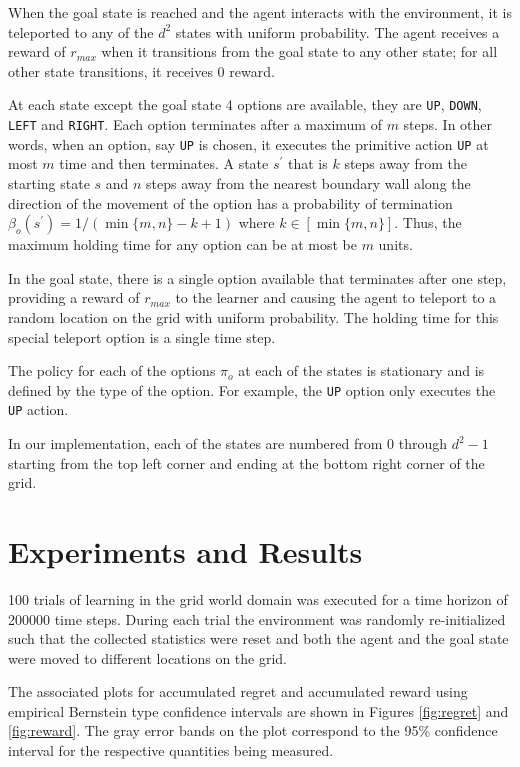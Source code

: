 When the goal state is reached and the agent interacts with the environment, it is teleported to any of the $d^2$ states with uniform probability.
The agent receives a reward of $r_{max}$ when it transitions from the goal state to any other state; for all other state transitions, it receives 0 reward.

At each state except the goal state 4 options are available, they are \texttt{UP}, \texttt{DOWN}, \texttt{LEFT} and \texttt{RIGHT}.
Each option terminates after a maximum of $m$ steps. 
In other words, when an option, say \texttt{UP} is chosen, it executes the primitive action \texttt{UP} at most $m$ time and then terminates.
A state $s^\prime$ that is $k$ steps away from the starting state $s$ and $n$ steps away from the nearest boundary wall along the direction of the movement of the option has a probability of termination $\beta_o(s^\prime) = 1/(\min\{m, n\} - k + 1)$ where $k \in [\min\{m, n\}]$.
Thus, the maximum holding time for any option can be at most be $m$ units.

In the goal state, there is a single option available that terminates after one step, providing a reward of $r_{max}$ to the learner and causing the agent to teleport to a random location on the grid with uniform probability.
The holding time for this special teleport option is a single time step.

The policy for each of the options $\pi_o$ at each of the states is stationary and is defined by the type of the option.
For example, the \texttt{UP} option only executes the \texttt{UP} action.

In our implementation, each of the states are numbered from 0 through $d^2 - 1$ starting from the top left corner and ending at the bottom right corner of the grid.


\section{Experiments and Results}

100 trials of learning in the grid world domain was executed for a time horizon of 200000 time steps.
During each trial the environment was randomly re-initialized such that the collected statistics were reset and both the agent and the goal state were moved to different locations on the grid.

The associated plots for accumulated regret and accumulated reward using empirical Bernstein type confidence intervals are shown in Figures \ref{fig:regret} and \ref{fig:reward}.
The gray error bands on the plot correspond to the 95\% confidence interval for the respective quantities being measured.

